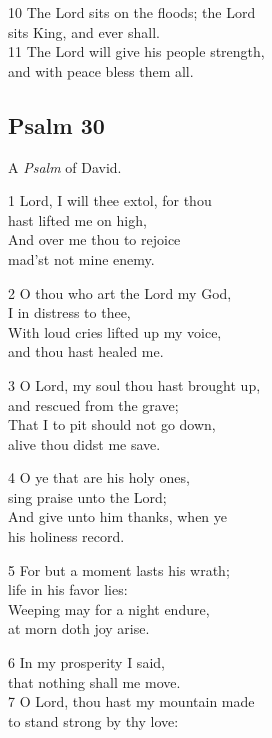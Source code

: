 \begin{multicols}{3}
10 The Lord sits on the floods; the Lord\\
sits King, and ever shall.\\
11 The Lord will give his people strength,\\
and with peace bless them all.\\

\begin{center}
\quad{}\quad{}
\end{center}

\subsection*{Psalm 30}

A \emph{Psalm} of David.

1 Lord, I will thee extol, for thou\\
hast lifted me on high,\\
And over me thou to rejoice\\
mad’st not mine enemy.

2 O thou who art the Lord my God,\\
I in distress to thee,\\
With loud cries lifted up my voice,\\
and thou hast healed me.

3 O Lord, my soul thou hast brought up,\\
and rescued from the grave;\\
That I to pit should not go down,\\
alive thou didst me save.

4 O ye that are his holy ones,\\
sing praise unto the Lord;\\
And give unto him thanks, when ye\\
his holiness record.

5 For but a moment lasts his wrath;\\
life in his favor lies:\\
Weeping may for a night endure,\\
at morn doth joy arise.

6 In my prosperity I said,\\
that nothing shall me move.\\
7 O Lord, thou hast my mountain made\\
to stand strong by thy love:


\end{multicols}
